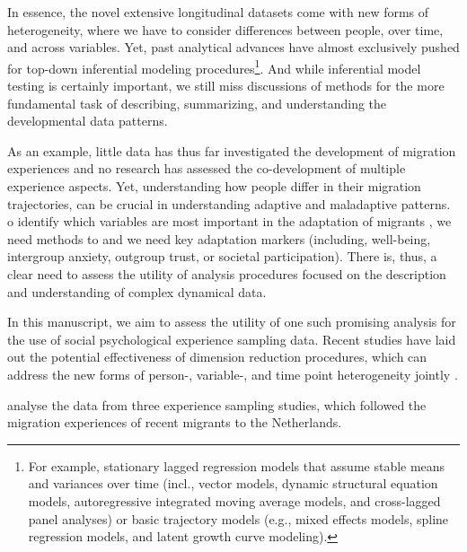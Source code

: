 \documentclass[]{article}
\let\rmarkdownfootnote\footnote%
\def\footnote{\protect\rmarkdownfootnote}
\begin{document}
In essence, the novel extensive longitudinal datasets come with new
forms of heterogeneity, where we have to consider differences between
people, over time, and across variables. Yet, past analytical advances
have almost exclusively pushed for top-down inferential modeling
procedures\footnote{For example, stationary lagged regression models
  that assume stable means and variances over time (incl., vector
   models, dynamic structural
  equation models, autoregressive integrated moving average models, and
  cross-lagged panel analyses) or basic trajectory models (e.g., mixed
  effects models, spline regression models, and latent growth curve
  modeling).}. And while inferential model testing is certainly
important, we still miss discussions of methods for the more fundamental
task of describing, summarizing, and understanding the developmental
data patterns.

As an example, little data has thus far investigated the development of
migration experiences and no research has assessed the co-development of
multiple experience aspects. Yet, understanding how people differ in
their migration trajectories, can be crucial in understanding adaptive
and maladaptive patterns. o identify
which variables are most important in the adaptation of migrants
, we need methods to
and we need 
key adaptation markers (including, well-being, intergroup anxiety,
outgroup trust, or societal participation). There is, thus, a clear need
to assess the utility of analysis procedures focused on the description
and understanding of complex dynamical data.

In this manuscript, we aim to assess the utility of one such promising
analysis for the use of social psychological experience sampling data.
Recent studies have laid out the potential effectiveness of dimension
reduction procedures, which can address the new forms of person-,
variable-, and time point heterogeneity jointly \citep[i.e., three-mode
principle component analyses, 3MPCA; e.g.,][]{Monden2015}.

 analyse the data
from three experience sampling studies, which followed the migration
experiences of recent migrants to the Netherlands.
\citep{Kreienkamp2022d}
\end{document}

